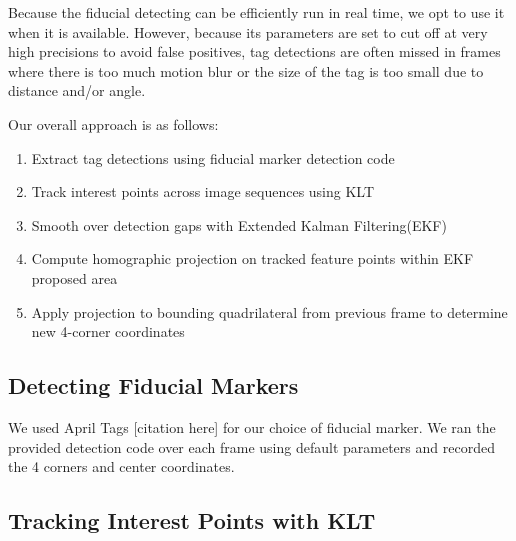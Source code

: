 \documentclass[12pt]{article}
\begin{document}
Because the fiducial detecting can be efficiently run in real time, we opt to use it when it is available. However, because its parameters are set to cut off at very high precisions to avoid false positives, tag detections are often missed in frames where there is too much motion blur or the size of the tag is too small due to distance and/or angle.

Our overall approach is as follows:
\begin{enumerate}
\item Extract tag detections using fiducial marker detection code
\item Track interest points across image sequences using KLT
\item Smooth over detection gaps with Extended Kalman Filtering(EKF)
\item Compute homographic projection on tracked feature points within EKF proposed area
\item Apply projection to bounding quadrilateral from previous frame to determine new 4-corner coordinates
\end{enumerate}

\subsection{Detecting Fiducial Markers}
We used April Tags [citation here] for our choice of fiducial marker. We ran the provided detection code over each frame using default parameters and recorded the 4 corners and center coordinates.
\subsection{Tracking Interest Points with KLT}
\end{document}
